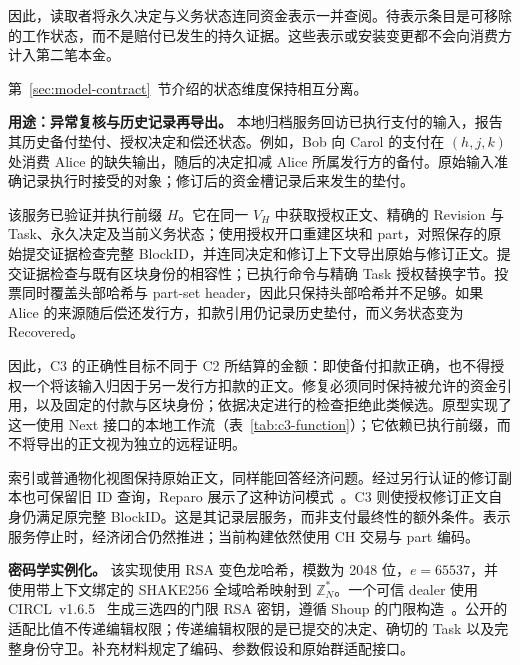 因此，读取者将永久决定与义务状态连同资金表示一并查阅。待表示条目是可移除的工作状态，而不是赔付已发生的持久证据。这些表示或安装变更都不会向消费方计入第二笔本金。

第~\ref{sec:model-contract}~节介绍的状态维度保持相互分离。

\noindent\textbf{用途：异常复核与历史记录再导出。}
本地归档服务回访已执行支付的输入，报告其历史备付垫付、授权决定和偿还状态。例如，Bob 向 Carol 的支付在 $(h,j,k)$ 处消费 Alice 的缺失输出，随后的决定扣减 Alice 所属发行方的备付。原始输入准确记录执行时接受的对象；修订后的资金槽记录后来发生的垫付。

该服务已验证并执行前缀 $H$。它在同一 $V_H$ 中获取授权正文、精确的 Revision 与 Task、永久决定及当前义务状态；使用授权开口重建区块和 part，对照保存的原始提交证据检查完整 BlockID，并连同决定和修订上下文导出原始与修订正文。提交证据检查与既有区块身份的相容性；已执行命令与精确 Task 授权替换字节。投票同时覆盖头部哈希与 part-set header，因此只保持头部哈希并不足够。如果 Alice 的来源随后偿还发行方，扣款引用仍记录历史垫付，而义务状态变为 Recovered。

因此，C3 的正确性目标不同于 C2 所结算的金额：即使备付扣款正确，也不得授权一个将该输入归因于另一发行方扣款的正文。修复必须同时保持被允许的资金引用，以及固定的付款与区块身份；依据决定进行的检查拒绝此类候选。原型实现了这一使用 Next 接口的本地工作流（表~\ref{tab:c3-function}）；它依赖已执行前缀，而不将导出的正文视为独立的远程证明。

索引或普通物化视图保持原始正文，同样能回答经济问题。经过另行认证的修订副本也可保留旧 ID 查询，Reparo 展示了这种访问模式~\cite{reparo}。C3 则使授权修订正文自身仍满足原完整 BlockID。这是其记录层服务，而非支付最终性的额外条件。表示服务停止时，经济闭合仍然推进；当前构建依然使用 CH 交易与 part 编码。

\noindent\textbf{密码学实例化。}
该实现使用 RSA 变色龙哈希，模数为 2048 位，$e=65537$，并使用带上下文绑定的 SHAKE256 全域哈希映射到 $\mathbb Z_N^*$。一个可信 dealer 使用 CIRCL~v1.6.5~\cite{circl} 生成三选四的门限 RSA 密钥，遵循 Shoup 的门限构造~\cite{shoup}。公开的适配比值不传递编辑权限；传递编辑权限的是已提交的决定、确切的 Task 以及完整身份守卫。补充材料规定了编码、参数假设和原始群适配接口。
